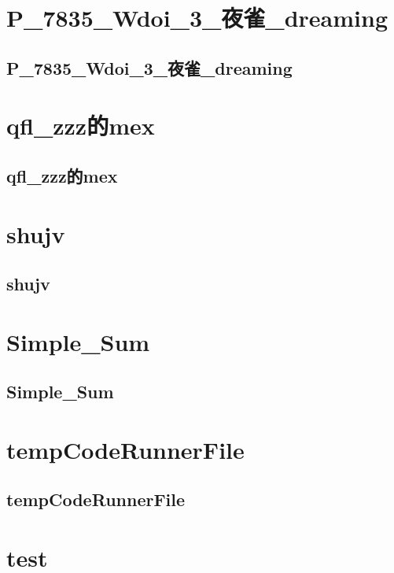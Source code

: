 \section{P\_7835\_Wdoi\_3\_夜雀\_dreaming}
\subsection{P\_7835\_Wdoi\_3\_夜雀\_dreaming}
\raggedbottom
\hrulefill

\section{qfl\_zzz的mex}
\subsection{qfl\_zzz的mex}
\raggedbottom
\hrulefill

\section{shujv}
\subsection{shujv}
\raggedbottom
\hrulefill

\section{Simple\_Sum}
\subsection{Simple\_Sum}
\raggedbottom
\hrulefill

\section{tempCodeRunnerFile}
\subsection{tempCodeRunnerFile}
\raggedbottom
\hrulefill

\section{test}
